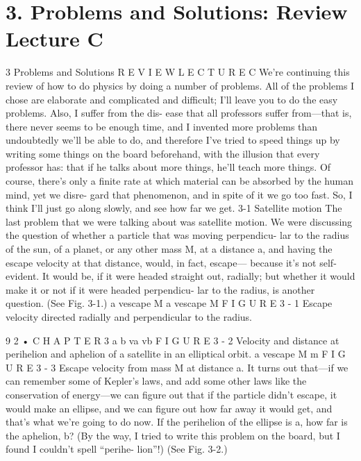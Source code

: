 \documentclass[10pt,oneside]{article}
\begin{document}
\section*{3. Problems and Solutions: Review Lecture C}
\label{tips-sec-11-3-problems-and-solutions-review-lecture-c}
3 Problems and Solutions R E V I E W  L E C T U R E  C We’re continuing this review of how to do physics by doing a number of problems. All of the problems I chose are elaborate and complicated and difficult; I’ll leave you to do the easy problems. Also, I suffer from the dis- ease that all professors suffer from---that is, there never seems to be enough time, and I invented more problems than undoubtedly we’ll be able to do, and therefore I’ve tried to speed things up by writing some things on the board beforehand, with the illusion that every professor has: that if he talks about more things, he’ll teach more things. Of course, there’s only a finite rate at which material can be absorbed by the human mind, yet we disre- gard that phenomenon, and in spite of it we go too fast. So, I think I’ll just go along slowly, and see how far we get. 3-1 Satellite motion The last problem that we were talking about was satellite motion. We were discussing the question of whether a particle that was moving perpendicu- lar to the radius of the sun, of a planet, or any other mass M, at a distance a, and having the escape velocity at that distance, would, in fact, escape--- because it’s not self-evident. It would be, if it were headed straight out, radially; but whether it would make it or not if it were headed perpendicu- lar to the radius, is another question. (See Fig. 3-1.) a vescape M a vescape M F I G U R E  3 - 1 Escape velocity directed radially and perpendicular to the radius.\par

9 2 • C H A P T E R  3 a b va vb F I G U R E  3 - 2 Velocity and distance at perihelion and aphelion of a satellite in an elliptical orbit. a vescape M m F I G U R E  3 - 3 Escape velocity from mass M at distance a. It turns out that---if we can remember some of Kepler’s laws, and add some other laws like the conservation of energy---we can figure out that if the particle didn’t escape, it would make an ellipse, and we can figure out how far away it would get, and that’s what we’re going to do now. If the perihelion of the ellipse is a, how far is the aphelion, b? (By the way, I tried to write this problem on the board, but I found I couldn’t spell “perihe- lion”!) (See Fig. 3-2.)\par
\end{document}
